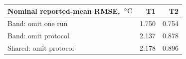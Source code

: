 \begin{tabularx}{\linewidth}{@{}Xrr@{}}
\toprule
Nominal reported-mean RMSE, $\,^\circ\mathrm{C}$ & T1 & T2\\
\midrule
Band: omit one run & 1.750 & 0.754\\
Band: omit protocol & 2.137 & 0.878\\
Shared: omit protocol & 2.178 & 0.896\\
\bottomrule
\end{tabularx}
